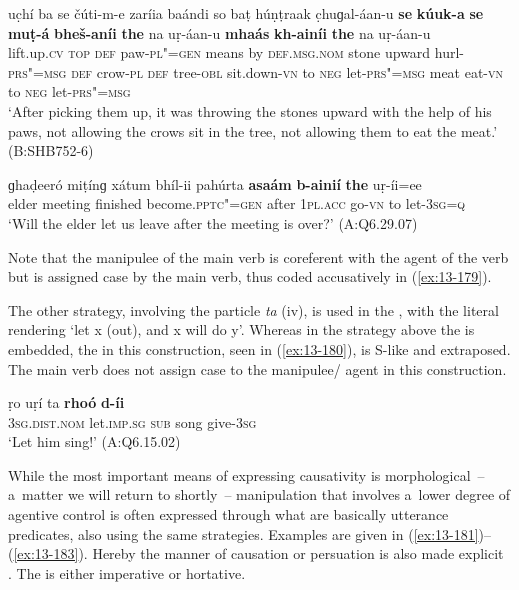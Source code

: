 \begin{exe}
\ex
\label{ex:13-178}
\gll uc̣hí ba se čúti-m-e zaríia baándi  so baṭ húṇṭraak c̣huɡal-áan-u \textbf{se} \textbf{kúuk-a} \textbf{se} \textbf{muṭ-á} \textbf{bheš-aníi} \textbf{the} na  uṛ-áan-u \textbf{mhaás} \textbf{kh-ainíi} \textbf{the} na uṛ-áan-u\\
lift.up.\textsc{cv} \textsc{top} \textsc{def} paw-\textsc{pl"=gen} means by  \textsc{def.msg.nom} stone upward hurl-\textsc{prs"=msg}  \textsc{def} crow-\textsc{pl} \textsc{def} tree-\textsc{obl} sit.down-\textsc{vn} to \textsc{neg} let-\textsc{prs"=msg} meat eat-\textsc{vn} to \textsc{neg} let-\textsc{prs"=msg}\\
\glt `After picking them up, it was throwing the stones upward with the help of his paws, not allowing the crows sit in the tree, not allowing them to eat the meat.' (B:SHB752-6)

\ex
\label{ex:13-179}
\gll ɡhaḍeeró miṭínɡ xátum bhíl-ii pahúrta \textbf{asaám} \textbf{b-ainií} \textbf{the} uṛ-íi=ee\\
elder meeting finished become.\textsc{pptc"=gen} after \textsc{1pl.acc} go-\textsc{vn} to let-\textsc{3sg=q}\\
\glt `Will the elder let us leave after the meeting is over?' (A:Q6.29.07) 
\end{exe}

Note that the manipulee of the main verb is coreferent with the agent of the  verb but is assigned case by the main verb, thus coded accusatively in (\ref{ex:13-179}).


The other strategy, involving the particle \textit{ta} (iv), is used in the , with the literal rendering `let x (out), and x will do y'. Whereas in the strategy above the  is embedded, the  in this construction, seen in (\ref{ex:13-180}), is S-like and extraposed. The main verb does not assign case to the manipulee/ agent in this construction.

\begin{exe}
\ex
\label{ex:13-180}
\gll ṛo uṛí ta \textbf{rhoó} \textbf{d-íi} \\
\textsc{3sg.dist.nom} let.\textsc{imp.sg} \textsc{ sub} song give-\textsc{3sg} \\
\glt `Let him sing!' (A:Q6.15.02) 
\end{exe}

 While the most important means of expressing causativity is morphological~-- a~matter we will return to shortly~-- manipulation that involves a~lower degree of agentive control \citep[45]{givon2001b} is often expressed through what are basically utterance predicates, also using the same strategies. Examples are given in (\ref{ex:13-181})--(\ref{ex:13-183}). Hereby the manner of causation or persuation is also made explicit \citep[136]{noonan2007}. The  is either imperative or hortative.

